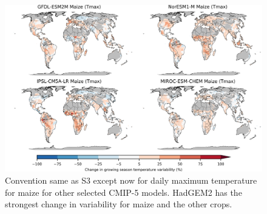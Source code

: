 \documentclass[12pt]{article}
\begin{document}
\begin{figure}[h!]
  \centering
  \includegraphics[width = 14cm]{other_models_var_change_max.png}
  \caption{
  Convention same as S3 except now for daily maximum temperature for maize for other selected CMIP-5 models. HadGEM2 has the strongest change in variability for maize and the other crops.
  }
  \label{fig:var}
\end{figure}
\end{document}
